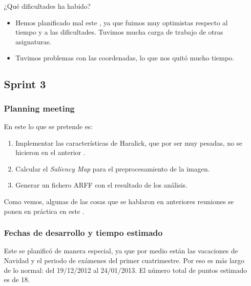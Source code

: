 ¿Qué dificultades ha habido?
\begin{itemize}
 \item Hemos planificado mal este \sprint{}, ya que fuimos muy optimistas respecto al tiempo y a las dificultades. Tuvimos mucha carga de trabajo de otras asignaturas.
 \item Tuvimos problemas con las coordenadas, lo que nos quitó mucho tiempo.
\end{itemize}

\subsection{Sprint 3}
\subsubsection*{Planning meeting}
En este \sprint{} lo que se pretende es:

\begin{enumerate}
\item Implementar las características de Haralick, que por ser muy pesadas, no se hicieron en el anterior \sprint{}.
\item Calcular el \textit{Saliency Map} para el preprocesamiento de la imagen.
\item Generar un fichero ARFF con el resultado de los análisis.
\end{enumerate}

Como vemos, algunas de las cosas que se hablaron en anteriores reuniones se ponen en práctica en este \sprint{}.

\subsubsection*{Fechas de desarrollo y tiempo estimado}
Este \sprint{} se planificó de manera especial, ya que por medio están las vacaciones de Navidad y el periodo de exámenes del primer cuatrimestre. Por eso es más largo de lo normal: del 19/12/2012 al 24/01/2013. El número total de puntos estimado es de 18.

